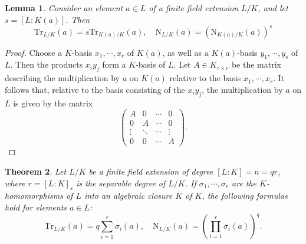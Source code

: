 \documentclass[12pt]{report}
\newtheorem{theorem}{Theorem}[section]
\newtheorem{lemma}[theorem]{Lemma}
\theoremstyle{definition}
\newcommand{\Tr}{\text{Tr}}
\newcommand{\nm}{\text{N}}
\begin{document}
\begin{lemma}
	Consider an element $a \in L$ of a finite field extension $L/K$, and let $s = [L : K(a)]$. Then $$\Tr_{L/K}(a)=s\Tr_{K(a)/K}(a),\quad \nm_{L/K}(a)=(\nm_{K(a)/K}(a))^s$$
\end{lemma}

\begin{proof}
	Choose a $K$-basis $x_1, \cdots , x_r$ of $K(a)$, as well as a $K(a)$-basis $y_1, \cdots , y_s$ of $L$. Then the products $x_iy_j$ form a $K$-basis of $L$. Let $A \in K_{r\times r}$ be the matrix describing the multiplication by $a$ on $K(a)$ relative to the basis $x_1, \cdots , x_r$. It follows that, relative to the basis consisting of the $x_iy_j$, the multiplication by $a$ on $L$ is given by the matrix
	$$\begin{pmatrix}
			A      & 0      & \cdots & 0      \\
			0      & A      & \cdots & 0      \\
			\vdots & \ddots & \cdots & \vdots \\
			0      & 0      & \cdots & A
		\end{pmatrix}.$$
\end{proof}

\begin{theorem}\label{trnmfor}
	Let $L/K$ be a finite field extension of degree $[L : K] =n= qr$, where $r = [L : K]_s$ is the separable degree of $L/K$. If $\sigma_1, \cdots , \sigma_r$ are the $K$-homomorphisms of $L$ into an algebraic closure $\overline{K}$ of $K$, the following formulas hold for elements $a \in L$: $$\Tr_{L/K}(a)=q\sum_{i=1}^r \sigma_i(a),\quad \nm_{L/K}(a) = (\prod_{i=1}^r \sigma_i(a))^q. $$
\end{theorem}
\end{document}
